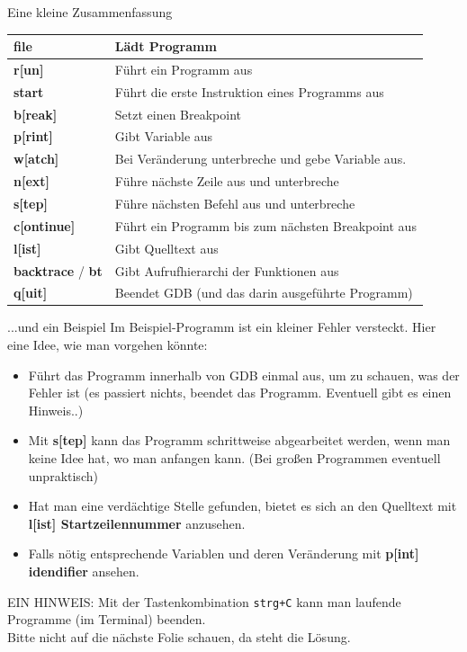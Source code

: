 \begin{frame}{Eine kleine Zusammenfassung}
		\begin{tabular}{|l|l|}
			\hline
			\textbf{file} & L\"adt Programm\\\hline
			\textbf{r[un]} & F\"uhrt ein Programm aus\\\hline
			\textbf{start} & Führt die erste Instruktion eines Programms aus\\\hline
			\textbf{b[reak]} & Setzt einen Breakpoint\\\hline
			\textbf{p[rint]} & Gibt Variable aus\\\hline
			\textbf{w[atch]} & Bei Ver\"anderung unterbreche und gebe Variable aus.\\\hline
			\textbf{n[ext]} & F\"uhre n\"achste Zeile aus und unterbreche\\\hline
			\textbf{s[tep]} & F\"uhre n\"achsten Befehl aus und unterbreche\\\hline
			\textbf{c[ontinue]} & F\"uhrt ein Programm bis zum n\"achsten Breakpoint aus\\\hline
			\textbf{l[ist]} & Gibt Quelltext aus\\\hline
			\textbf{backtrace} / \textbf{bt} & Gibt Aufrufhierarchi der Funktionen aus\\\hline
			\textbf{q[uit]}  & Beendet GDB (und das darin ausgeführte Programm)\\\hline
		\end{tabular}	
\end{frame}
\begin{frame}{...und ein Beispiel}
Im Beispiel-Programm ist ein kleiner Fehler versteckt. Hier eine Idee, wie man vorgehen könnte:
\begin{itemize}
    \item F\"uhrt das Programm innerhalb von GDB einmal aus, um zu schauen, was der Fehler ist (es passiert nichts, beendet das Programm. Eventuell gibt es einen Hinweis..)
    \item Mit \textbf{s[tep]} kann das Programm schrittweise abgearbeitet werden, wenn man keine Idee hat, wo man anfangen kann. (Bei großen Programmen eventuell unpraktisch)
    \item Hat man eine verdächtige Stelle gefunden, bietet es sich an den Quelltext mit \textbf{l[ist] Startzeilennummer} anzusehen.
    \item Falls nötig entsprechende Variablen und deren Ver\"anderung mit \textbf{p[int] idendifier} ansehen. 
\end{itemize}
EIN HINWEIS: Mit der Tastenkombination \texttt{strg+C} kann man laufende Programme (im Terminal) beenden. \\
Bitte nicht auf die n\"achste Folie schauen, da steht die Lösung.
\end{frame}

